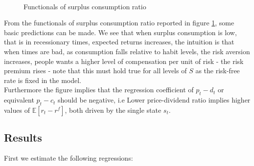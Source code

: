 \begin{figure}[H]
\centering
\caption{Functionals of surplus consumption ratio}
    \label{fig:SPCPD}
 ~
\end{figure}

From the functionals of surplus consumption ratio reported in figure \ref{fig:SPCPD}, some basic predictions can be made. We see that when surplus consumption is low, that is in recessionary times, expected returns increases, the intuition is that when times are bad, as consumption falls relative to habit levels, the risk aversion increases, people wants a higher level of compensation per unit of risk - the risk premium rises - note that this must hold true for all levels of $S$ as the risk-free rate is fixed in the model. \\
Furthermore the figure implies that the regression coefficient of $p_t-d_t$ or equivalent $p_t-c_t$ should be negative, i.e Lower price-dividend ratio implies higher values of $\mathbb{E}\left[r_t-r^f\right]$, both driven by the single state $s_t$.  
\subsection{Results}

First we estimate the following regressions:

